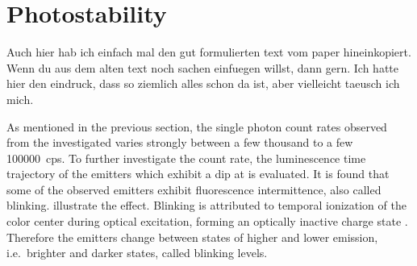 



	\section{Photostability} \label{subsec::photostab}

		\begin{remark}
			Auch hier hab ich einfach mal den gut formulierten text vom paper hineinkopiert. Wenn du aus dem alten text noch sachen einfuegen willst, dann gern. Ich hatte hier den eindruck, dass so ziemlich alles schon da ist, aber vielleicht taeusch ich mich.
		\end{remark}

		As mentioned in the previous section, the single photon count rates observed from the investigated \sivs varies strongly between a few thousand to a few \SI{100000}{cps}.
		To further investigate the count rate, the luminescence time trajectory of the emitters which exhibit a dip at \gtz is evaluated.
		It is found that some of the observed emitters exhibit fluorescence intermittence, also called blinking.  illustrate the effect.
		Blinking is attributed to temporal ionization of the color center during optical excitation, forming an optically inactive charge state \cite{Jantzen2016,Neu2012a,Gali2013}.
		Therefore the emitters change between states of higher and lower emission, i.e.\ brighter and darker states, called blinking levels.

